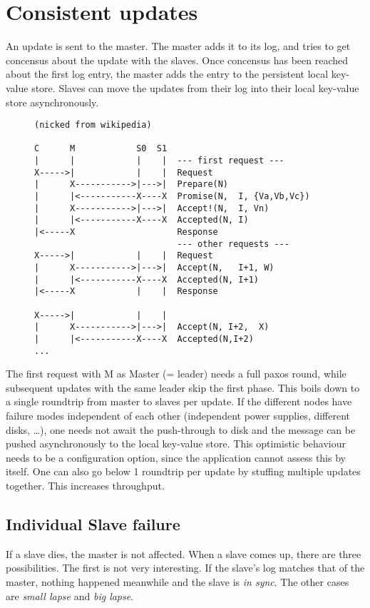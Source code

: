 
\section{Consistent updates}
An update is sent to the master.
The master adds it to its log, and tries to get concensus about the update with the slaves.
Once concensus has been reached about the first log entry,
the master  adds the entry to the persistent local key-value store.
Slaves can move the updates from their log
into their local key-value store asynchronously.

\begin{figure}
\begin{verbatim}
(nicked from wikipedia)

C      M            S0  S1
|      |            |    |  --- first request ---
X----->|            |    |  Request
|      X----------->|--->|  Prepare(N)
|      |<-----------X----X  Promise(N,  I, {Va,Vb,Vc})
|      X----------->|--->|  Accept!(N,  I, Vn)
|      |<-----------X----X  Accepted(N, I)
|<-----X                    Response
                            --- other requests ---
X----->|            |    |  Request
|      X----------->|--->|  Accept(N,   I+1, W)
|      |<-----------X----X  Accepted(N, I+1)
|<-----X            |    |  Response

X----->|            |    |
|      X----------->|--->|  Accept(N, I+2,  X)
|      |<-----------X----X  Accepted(N,I+2)
...
\end{verbatim}
\end{figure}
The first request with M as Master (= leader) needs a full paxos round,
while subsequent updates with the same leader skip the first phase.
This boils down to a single roundtrip from master to slaves per update.
If the different nodes have failure modes independent of each other (independent power supplies, different disks, \ldots),
one needs not await the push-through to disk and the message can be pushed asynchronously to the local key-value store.
This optimistic behaviour needs to be a configuration option, since the application cannot assess this by itself.
One can also go below 1 roundtrip per update by stuffing multiple updates together.
This increases throughput.


\subsection{Individual Slave failure}
If a slave dies, the master is not affected.
When a slave comes up, there are three possibilities. 
The first is not very interesting. If the slave's log matches that of the master, nothing happened meanwhile and the slave is \emph{in sync}. 
The other cases are \emph{small lapse} and \emph{big lapse}.
